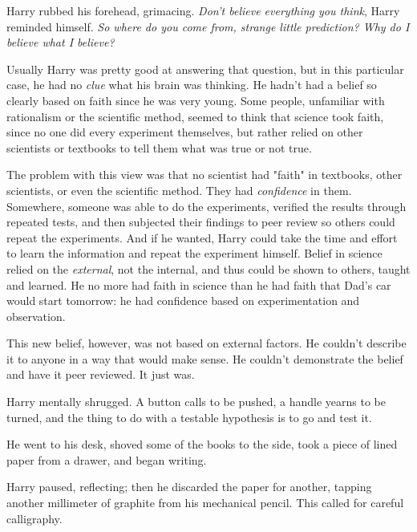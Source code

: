 Harry rubbed his forehead, grimacing. \emph{Don't believe
everything you think}, Harry reminded himself. \emph{So where
do you come from, strange little prediction? Why do I
believe what I believe?}

Usually Harry was pretty good at answering that question,
but in this particular case, he had no \emph{clue} what his brain
was thinking. He hadn't had a belief so clearly based on
faith since he was very young. Some people, unfamiliar
with rationalism or the scientific method, seemed to think
that science took faith, since no one did every experiment
themselves, but rather relied on other scientists or
textbooks to tell them what was true or not true.

The problem with this view was that no scientist had
"faith" in textbooks, other scientists, or even the scientific
method. They had \emph{confidence} in them. Somewhere,
someone was able to do the experiments, verified the
results through repeated tests, and then subjected their
findings to peer review so others could repeat the
experiments. And if he wanted, Harry could take the time
and effort to learn the information and repeat the
experiment himself. Belief in science relied on the \emph{external},
not the internal, and thus could be shown to others,
taught and learned. He no more had faith in science than
he had faith that Dad's car would start tomorrow: he had
confidence based on experimentation and observation.

This new belief, however, was not based on external
factors. He couldn't describe it to anyone in a way that
would make sense. He couldn't demonstrate the belief and
have it peer reviewed. It just was.

Harry mentally shrugged. A button calls to be pushed, a
handle yearns to be turned, and the thing to do with a
testable hypothesis is to go and test it.

He went to his desk, shoved some of the books to the
side, took a piece of lined paper from a drawer, and began writing.

\begin{writtenNote}
\end{writtenNote}

Harry paused, reflecting; then he discarded the paper for another, tapping another
millimeter of graphite from his mechanical pencil. This called for careful
calligraphy.

